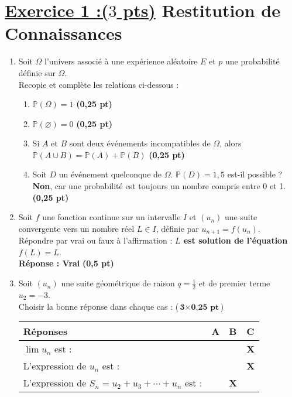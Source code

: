 \documentclass[12pt,a4paper]{article}
\begin{document}
\section*{\underline{Exercice 1 :($3$ pts)} Restitution de Connaissances}
\begin{enumerate}
    \item Soit \( \Omega \) l’univers associé à une expérience aléatoire \( E \) et \( p \) une probabilité définie sur \( \Omega \).\\
    Recopie et complète les relations ci-dessous :
    \begin{enumerate}
        \item \( \mathbb{P}(\Omega) = 1 \) \hfill \textbf{(0,25 pt)}
        \item \( \mathbb{P}(\varnothing) = 0 \) \hfill \textbf{(0,25 pt)}
        \item Si \( A \) et \( B \) sont deux événements incompatibles de \( \Omega \), alors \( \mathbb{P}(A \cup B) = \mathbb{P}(A) + \mathbb{P}(B) \) \hfill \textbf{(0,25 pt)}
        \item Soit \( D \) un événement quelconque de \( \Omega \). \( \mathbb{P}(D) = 1{,}5 \) est-il possible ?\\
        \textbf{Non}, car une probabilité est toujours un nombre compris entre 0 et 1. \hfill \textbf{(0,25 pt)}
    \end{enumerate}
    
    \item Soit \( f \) une fonction continue sur un intervalle \( I \) et \( (u_n) \) une suite convergente vers un nombre réel \( L \in I \), définie par \( u_{n+1} = f(u_n) \).\\
    Répondre par vrai ou faux à l’affirmation : \textbf{\( L \) est solution de l’équation \( f(L) = L \)}. \\
    \textbf{Réponse : Vrai} \hfill \textbf{(0,5 pt)}
    
    \item Soit \( (u_n) \) une suite géométrique de raison \( q = \frac{1}{2} \) et de premier terme \( u_2 = -3 \).\\
    Choisir la bonne réponse dans chaque cas : \hfill (\( \textbf{3} \times \textbf{0,25 pt} \))

    \begin{center}
    \renewcommand{\arraystretch}{1.5}
    \begin{tabular}{|>{\centering\arraybackslash}m{5cm}|>{\centering\arraybackslash}m{3cm}|>{\centering\arraybackslash}m{3cm}|>{\centering\arraybackslash}m{3cm}|}
        \hline
        \textbf{Réponses} & \textbf{A} & \textbf{B} & \textbf{C} \\
        \hline
        \( \lim u_n \) est : &  &  & \textbf{X} \\
        \hline
        L’expression de \( u_n \) est : &  &  & \textbf{X} \\
        \hline
        L’expression de \( S_n = u_2 + u_3 + \cdots + u_n \) est : &  & \textbf{X} &  \\
        \hline
    \end{tabular}
    \end{center}

\end{enumerate}
\end{document}
